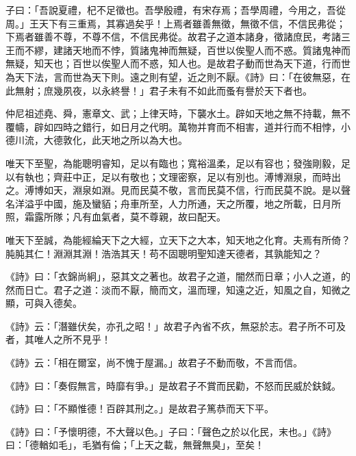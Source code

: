 \documentclass[12pt,a4paper]{ctexbook}
\begin{document}
子曰：「吾說夏禮，杞不足徵也。吾學殷禮，有宋存焉；吾學周禮，今用之，吾從周。」王天下有三重焉，其寡過矣乎！上焉者雖善無徵，無徵不信，不信民弗從；下焉者雖善不尊，不尊不信，不信民弗從。故君子之道本諸身，徵諸庶民，考諸三王而不繆，建諸天地而不悖，質諸鬼神而無疑，百世以俟聖人而不惑。質諸鬼神而無疑，知天也；百世以俟聖人而不惑，知人也。是故君子動而世為天下道，行而世為天下法，言而世為天下則。遠之則有望，近之則不厭。《詩》曰：「在彼無惡，在此無射；庶幾夙夜，以永終譽！」君子未有不如此而蚤有譽於天下者也。\par
仲尼祖述堯、舜，憲章文、武；上律天時，下襲水土。辟如天地之無不持載，無不覆幬，辟如四時之錯行，如日月之代明。萬物并育而不相害，道并行而不相悖，小德川流，大德敦化，此天地之所以為大也。\par
唯天下至聖，為能聰明睿知，足以有臨也；寬裕溫柔，足以有容也；發強剛毅，足以有執也；齊莊中正，足以有敬也；文理密察，足以有別也。溥博淵泉，而時出之。溥博如天，淵泉如淵。見而民莫不敬，言而民莫不信，行而民莫不說。是以聲名洋溢乎中國，施及蠻貊；舟車所至，人力所通，天之所覆，地之所載，日月所照，霜露所隊；凡有血氣者，莫不尊親，故曰配天。\par
唯天下至誠，為能經綸天下之大經，立天下之大本，知天地之化育。夫焉有所倚？肫肫其仁！淵淵其淵！浩浩其天！苟不固聰明聖知達天德者，其孰能知之？\par
《詩》曰：「衣錦尚絅」，惡其文之著也。故君子之道，闇然而日章；小人之道，的然而日亡。君子之道：淡而不厭，簡而文，溫而理，知遠之近，知風之自，知微之顯，可與入德矣。\par
《詩》云：「潛雖伏矣，亦孔之昭！」故君子內省不疚，無惡於志。君子所不可及者，其唯人之所不見乎！\par
《詩》云：「相在爾室，尚不愧于屋漏。」故君子不動而敬，不言而信。\par
《詩》曰：「奏假無言，時靡有爭。」是故君子不賞而民勸，不怒而民威於鈇鉞。\par
《詩》曰：「不顯惟德！百辟其刑之。」是故君子篤恭而天下平。\par
《詩》曰：「予懷明德，不大聲以色。」子曰：「聲色之於以化民，末也。」《詩》曰：「德輶如毛」，毛猶有倫；「上天之載，無聲無臭」，至矣！\par
\end{document}
